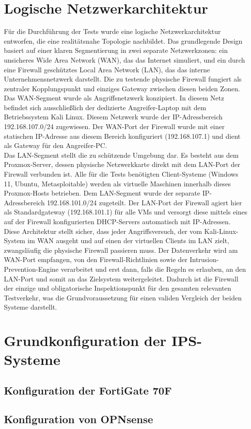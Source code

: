 \section{Logische Netzwerkarchitektur}

Für die Durchführung der Tests wurde eine logische Netzwerkarchitektur entworfen, die eine realitätsnahe Topologie nachbildet. Das grundlegende Design basiert auf einer klaren Segmentierung in zwei separate Netzwerkzonen: ein unsicheres Wide Area Network (WAN), das das Internet simuliert, und ein durch eine Firewall geschütztes Local Area Network (LAN), das das interne Unternehmensnetzwerk darstellt. Die zu testende physische Firewall fungiert als zentraler Kopplungspunkt und einziges Gateway zwischen diesen beiden Zonen.\\

Das WAN-Segment wurde als Angriffsnetzwerk konzipiert. In diesem Netz befindet sich ausschließlich der dedizierte Angreifer-Laptop mit dem Betriebssystem Kali Linux. Diesem Netzwerk wurde der IP-Adressbereich 192.168.107.0/24 zugewiesen. Der WAN-Port der Firewall wurde mit einer statischen IP-Adresse aus diesem Bereich konfiguriert (192.168.107.1) und dient als Gateway für den Angreifer-PC.\\

Das LAN-Segment stellt die zu schützende Umgebung dar. Es besteht aus dem Proxmox-Server, dessen physische Netzwerkkarte direkt mit dem LAN-Port der Firewall verbunden ist. Alle für die Tests benötigten Client-Systeme (Windows 11, Ubuntu, Metasploitable) werden als virtuelle Maschinen innerhalb dieses Proxmox-Hosts betrieben. Dem LAN-Segment wurde der separate IP-Adressbereich 192.168.101.0/24 zugeteilt. Der LAN-Port der Firewall agiert hier als Standardgateway (192.168.101.1) für alle VMs und versorgt diese mittels eines auf der Firewall konfigurierten DHCP-Servers automatisch mit IP-Adressen.\\

Diese Architektur stellt sicher, dass jeder Angriffsversuch, der vom Kali-Linux-System im WAN ausgeht und auf einen der virtuellen Clients im LAN zielt, zwangsläufig die physische Firewall passieren muss. Der Datenverkehr wird am WAN-Port empfangen, von den Firewall-Richtlinien sowie der Intrusion-Prevention-Engine verarbeitet und erst dann, falls die Regeln es erlauben, an den LAN-Port und somit an das Zielsystem weitergeleitet. Dadurch ist die Firewall der einzige und obligatorische Inspektionspunkt für den gesamten relevanten Testverkehr, was die Grundvoraussetzung für einen validen Vergleich der beiden Systeme darstellt.

\section{Grundkonfiguration der IPS-Systeme}
\subsection{Konfiguration der FortiGate 70F}
\subsection{Konfiguration von OPNsense}